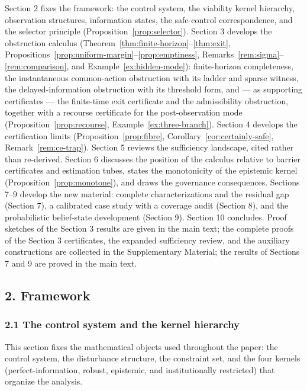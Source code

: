 \documentclass[10pt,twocolumn]{article}
\theoremstyle{definition}
\begin{document}
Section 2 fixes the framework: the control system, the viability kernel
hierarchy, observation structures, information states, the safe-control
correspondence, and the selector principle (Proposition~\ref{prop:selector}). Section 3 develops the obstruction calculus (Theorem~\ref{thm:finite-horizon}--\ref{thm:exit}, Propositions~\ref{prop:uniform-margin}--\ref{prop:emptiness}, Remarks~\ref{rem:sigma}--\ref{rem:comparison}, and Example~\ref{ex:hidden-mode}): finite-horizon completeness, the instantaneous common-action obstruction with its ladder and sparse witness, the delayed-information obstruction with its threshold form, and --- as supporting certificates --- the finite-time exit certificate and the admissibility obstruction, together with a recourse certificate for the post-observation mode (Proposition~\ref{prop:recourse}, Example~\ref{ex:three-branch}). Section 4 develops the certification limits
(Proposition~\ref{prop:fibre}, Corollary~\ref{cor:certainly-safe}, Remark~\ref{rem:ce-trap}). Section 5 reviews the sufficiency landscape, cited rather than re-derived. Section
6 discusses the position of the calculus relative to barrier
certificates and estimation tubes, states the monotonicity of the
epistemic kernel (Proposition~\ref{prop:monotone}), and draws the governance
consequences. Sections 7--9 develop the new material: complete characterizations and the residual gap (Section 7), a calibrated case study with a coverage audit (Section 8), and the probabilistic belief-state development (Section 9). Section 10 concludes. Proof sketches of the Section 3 results are given in the main text; the complete proofs of the Section 3 certificates, the expanded sufficiency review, and the auxiliary constructions are collected in the Supplementary Material; the results of Sections 7 and 9 are proved in the main text.



\subsection{2. Framework}\label{framework}

\subsubsection{2.1 The control system and the kernel
hierarchy}\label{the-control-system-and-the-kernel-hierarchy}

This section fixes the mathematical objects used throughout the paper:
the control system, the disturbance structure, the constraint set, and
the four kernels (perfect-information, robust, epistemic, and
institutionally restricted) that organize the analysis.
\end{document}
